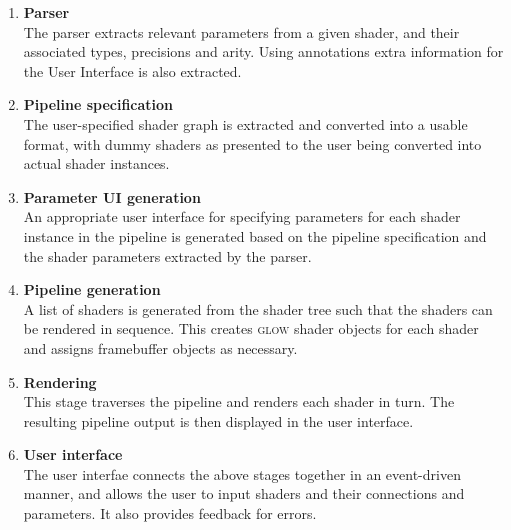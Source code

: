 \documentclass[12pt,twoside,notitlepage]{report}
\begin{document}
\begin{enumerate}
\item \textbf{Parser}\\
The parser extracts relevant parameters from a given shader, and their associated types, precisions and arity. Using annotations extra information for the User Interface is also extracted.
\item \textbf{Pipeline specification}\\
The user-specified shader graph is extracted and converted into a usable format, with dummy shaders as presented to the user being converted into actual shader instances.
\item \textbf{Parameter UI generation}\\
An appropriate user interface for specifying parameters for each shader instance in the pipeline is generated based on the pipeline specification and the shader parameters extracted by the parser.
\item \textbf{Pipeline generation}\\
A list of shaders is generated from the shader tree such that the shaders can be rendered in sequence. This creates \textsc{glow} shader objects for each shader and assigns framebuffer objects as necessary.
\item \textbf{Rendering}\\
This stage traverses the pipeline and renders each shader in turn. The resulting pipeline output is then displayed in the user interface.
\item \textbf{User interface}\\
The user interfae connects the above stages together in an event-driven manner, and allows the user to input shaders and their connections and parameters. It also provides feedback for errors.
\end{enumerate}

\clearpage
\end{document}
